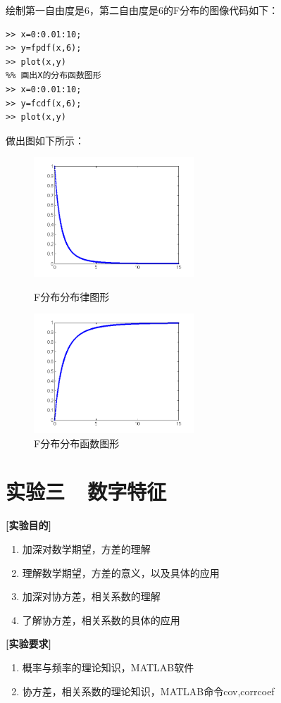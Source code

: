 \documentclass[12pt, a4paper]{ctexart}
\begin{document}
绘制第一自由度是6，第二自由度是6的F分布的图像代码如下：
\begin{lstlisting}[style=Matlab-editor]
%% 画出X的概率密度图形
>> x=0:0.01:10;
>> y=fpdf(x,6);
>> plot(x,y)
%% 画出X的分布函数图形
>> x=0:0.01:10;
>> y=fcdf(x,6);
>> plot(x,y)
\end{lstlisting}
做出图如下所示：
\begin{figure}[ht]
	\centering
	\begin{minipage}[t]{0.48\textwidth}
		\centering
		\includegraphics[width=6cm]{f6.png}
		\caption{F分布分布律图形}
	\end{minipage}
	\begin{minipage}[t]{0.48\textwidth}
		\centering
		\includegraphics[width=6cm]{f5.png}
		\caption{F分布分布函数图形}
	\end{minipage}
\end{figure}

\section{实验三~~数字特征}

\textbf{[实验目的]}
\begin{enumerate}
	\item 加深对数学期望，方差的理解
	\item 理解数学期望，方差的意义，以及具体的应用
	\item 加深对协方差，相关系数的理解
	\item 了解协方差，相关系数的具体的应用
\end{enumerate}

\textbf{[实验要求]}
\begin{enumerate}
	\item  概率与频率的理论知识，MATLAB软件
	\item  协方差，相关系数的理论知识，MATLAB命令cov,corrcoef
\end{enumerate}
\end{document}
